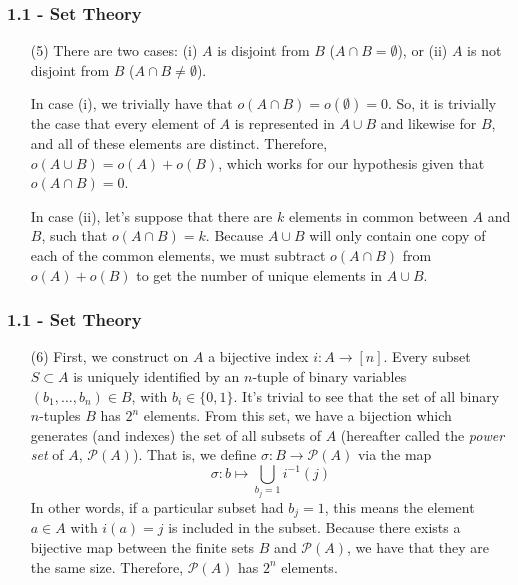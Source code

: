 \documentclass{beamer}
\begin{document}
\begin{frame}
\frametitle{1.1 - Set Theory}
\small
\begin{enumerate}
	\item[(5)] There are two cases: (i) $A$ is disjoint from $B$ ($A\cap B = \emptyset$), or (ii) $A$ is not disjoint from $B$ ($A\cap B \neq \emptyset$).
	
	\quad In case (i), we trivially have that $o(A\cap B) = o(\emptyset) = 0$. So, it is trivially the case that every element of $A$ is represented in $A\cup B$ and likewise for $B$, and all of these elements are distinct. Therefore, $o(A\cup B) = o(A) + o(B)$, which works for our hypothesis given that $o(A\cap B) = 0$.
	
	\quad In case (ii), let's suppose that there are $k$ elements in common between $A$ and $B$, such that $o(A\cap B) = k$. Because $A\cup B$ will only contain one copy of each of the common elements, we must subtract $o(A\cap B)$ from $o(A) + o(B)$ to get the number of unique elements in $A\cup B$.
\end{enumerate}
\end{frame}
\begin{frame}
\frametitle{1.1 - Set Theory}
\small
\begin{enumerate}
	\item[(6)] First, we construct on $A$ a bijective index $i: A\to [n]$. Every subset $S\subset A$ is uniquely identified by an $n$-tuple of binary variables $(b_1,\ldots,b_n)\in B$, with $b_i\in \{0, 1\}$. It's trivial to see that the set of all binary $n$-tuples $B$ has $2^n$ elements. From this set, we have a bijection which generates (and indexes) the set of all subsets of $A$ (hereafter called the \textit{power set} of $A$, $\mathcal{P}(A)$). That is, we define $\sigma: B\to \mathcal{P}(A)$ via the map 
	\begin{equation*}	
	\sigma: b\mapsto \bigcup_{b_j=1} i^{-1}(j)
	\end{equation*}
	In other words, if a particular subset had $b_j = 1$, this means the element $a\in A$ with $i(a) = j$ is included in the subset. Because there exists a bijective map between the finite sets $B$ and $\mathcal{P}(A)$, we have that they are the same size. Therefore, $\mathcal{P}(A)$ has $2^n$ elements.
\end{enumerate}
\end{frame}
\end{document}
